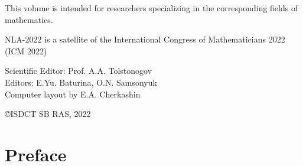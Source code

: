 \documentclass[12pt,final]{llncs}
\begin{document}
This volume is intended for researchers specializing in the corresponding fields of  ma\-the\-ma\-tics.

  \vspace{1cm}

NLA-2022  is a satellite of the International Congress of Mathematicians 2022 (ICM 2022)

 \vfill

  \vfill

 Scientific Editor: Prof. A.\;A. Tolstonogov\\[0.3em]

 Editors: E.\;Yu. Baturina, O.\;N. Samsonyuk\\[0.3em]

 Computer layout by E.\;A. Cherkashin

 \vfill



 \begin{flushright}
 \copyright ISDCT SB RAS, 2022
  \end{flushright}



\chapter*{Preface}
%
\end{document}
